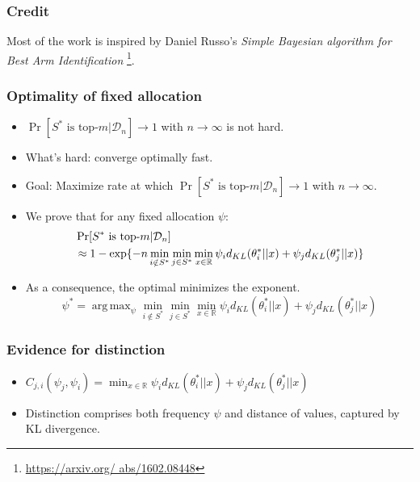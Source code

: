 \documentclass[aspectratio=43]{beamer}
\DeclareMathOperator*{\argmax}{arg\,max}
\newcommand{\tikzmark}[1]{\tikz[overlay,remember picture] \node (#1) {};}
\begin{document}
\begin{frame}
\frametitle{Credit}
Most of the work is inspired by Daniel Russo's \emph{Simple Bayesian
algorithm for Best Arm Identification} \footnote{\url{https://arxiv.org/
abs/1602.08448}}.
\end{frame}

\begin{frame}
\frametitle{Optimality of fixed allocation}
\begin{itemize}[<+->]
  \item $\Pr[S^* \text{ is top-}m | \mathcal{D}_n] \rightarrow 1$ with $n
      \rightarrow \infty$ is not hard.
  \item What's hard: converge optimally fast.
  \item Goal: Maximize rate at which $\Pr[S^* \text{ is top-}m |
      \mathcal{D}_n] \rightarrow 1$ with $n \rightarrow \infty$.
  \item We prove that for any fixed allocation $\psi$:
    \begin{align}
      &\Pr[S^* \text{ is top-}m | \mathcal{D}_n] \\
      &\approx 1 - \exp\{-n \min_{i \notin S^*} \min_{j \in S^*}
          \tikzmark{infrastructure}{\min_{x \in \mathbb{R}} \psi_i
          d_{KL}(\theta^*_i || x) + \psi_j d_{KL}(\theta^*_j || x)} \}
    \end{align}
  \item As a consequence, the optimal minimizes the exponent.
  \[\psi^* = \argmax_{\psi} \min_{i \notin S^*}\min_{j \in S^*} \min_{x \in
      \mathbb{R}} \psi_i d_{KL}(\theta^*_i || x) + \psi_j d_{KL}(\theta^*_j || x)\]
\end{itemize}
\pause{}
\end{frame}

\begin{frame}
\frametitle{Evidence for distinction}
\begin{itemize}[<+->]
  \item $C_{j, i}(\psi_j, \psi_i) = \min_{x \in \mathbb{R}} \psi_i d_{KL}
      (\theta^*_i || x) + \psi_j d_{KL}(\theta^*_j || x)$
  \item Distinction comprises both frequency $\psi$ and distance of values,
      captured by KL divergence.
\end{itemize}
\end{frame}
\end{document}
